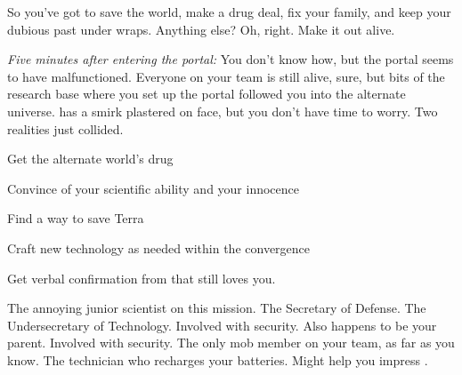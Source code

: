 \documentclass[char]{guildcamp3}
\begin{document}
So you've got to save the world, make a drug deal, fix your family, and keep your dubious past under wraps. Anything else? Oh, right. Make it out alive.

\emph{Five minutes after entering the portal:}
You don't know how, but the portal seems to have malfunctioned. Everyone on your team is still alive, sure, but bits of the research base where you set up the portal followed you into the alternate universe. \cSciOne{} has a smirk plastered on \cSciOne{\their} face, but you don't have time to worry. Two realities just collided.

\begin{itemz}[Goals]
  \item Get the alternate world's drug
  \item Convince \cSciTwo{} of your scientific ability and your innocence
  \item Find a way to save Terra
  \item Craft new technology as needed within the convergence
  \item Get verbal confirmation from \cSpecOpOne{} that \cSpecOpOne{\they} still loves you.
\end{itemz}



\begin{contacts}
  \contact{\cSciTwo{}} The annoying junior scientist on this mission.
  \contact{\cPoliOne{}} The Secretary of Defense.
  \contact{\cPoliTwo{}} The Undersecretary of Technology.
  \contact{\cSpecOpOne{}} Involved with security. Also happens to be your parent.
  \contact{\cSpecOpTwo{}} Involved with security. The only mob member on your team, as far as you know.
  \contact{\cTech{}} The technician who recharges your batteries. Might help you impress \cSciTwo{}.
\end{contacts}
\end{document}

